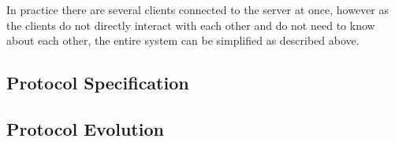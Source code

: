 In practice there are several clients connected to the server at once, however as the clients do not directly interact with each other and do not need to know about each other, the entire system can be simplified as described above.



\subsection{Protocol Specification}

\subsection{Protocol Evolution}
